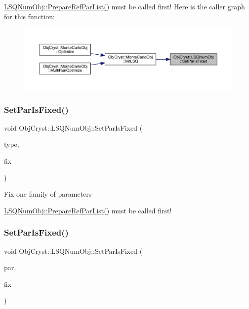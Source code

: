 \mbox{\hyperlink{class_obj_cryst_1_1_l_s_q_num_obj_afdeb58450a3e0506fc02a0b5df15a600}{L\+S\+Q\+Num\+Obj\+::\+Prepare\+Ref\+Par\+List()}} must be called first! Here is the caller graph for this function\+:
\nopagebreak
\begin{figure}[H]
\begin{center}
\leavevmode
\includegraphics[width=350pt]{class_obj_cryst_1_1_l_s_q_num_obj_a0bc210b1f4e4b7099493d71c1a7c084d_icgraph}
\end{center}
\end{figure}
\mbox{\label{class_obj_cryst_1_1_l_s_q_num_obj_a1be81668c496a3232e4b8416a3414bf3}} 
\subsubsection{\texorpdfstring{SetParIsFixed()}{SetParIsFixed()}\hspace{0.1cm}{\footnotesize\ttfamily [2/4]}}
{\footnotesize\ttfamily void Obj\+Cryst\+::\+L\+S\+Q\+Num\+Obj\+::\+Set\+Par\+Is\+Fixed (\begin{DoxyParamCaption}\item[{const \mbox{\hyperlink{class_obj_cryst_1_1_ref_par_type}{Ref\+Par\+Type}} $\ast$}]{type,  }\item[{const bool}]{fix }\end{DoxyParamCaption})}

Fix one family of parameters

\mbox{\hyperlink{class_obj_cryst_1_1_l_s_q_num_obj_afdeb58450a3e0506fc02a0b5df15a600}{L\+S\+Q\+Num\+Obj\+::\+Prepare\+Ref\+Par\+List()}} must be called first! \mbox{\label{class_obj_cryst_1_1_l_s_q_num_obj_ad240667179e473c6c16e8928893dfdf8}} 
\subsubsection{\texorpdfstring{SetParIsFixed()}{SetParIsFixed()}\hspace{0.1cm}{\footnotesize\ttfamily [3/4]}}
{\footnotesize\ttfamily void Obj\+Cryst\+::\+L\+S\+Q\+Num\+Obj\+::\+Set\+Par\+Is\+Fixed (\begin{DoxyParamCaption}\item[{\mbox{\hyperlink{class_obj_cryst_1_1_refinable_par}{Refinable\+Par}} \&}]{par,  }\item[{const bool}]{fix }\end{DoxyParamCaption})}

